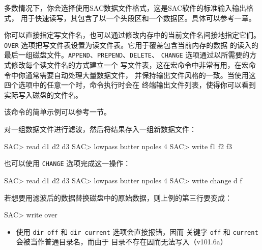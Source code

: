 多数情况下，你会选择使用SAC数据文件格式，这是SAC软件的标准输入输出格式，
用于快速读写，其包含了以一个头段区和一个数据区。具体可以参考一章。

你可以直接指定写文件名，也可以通过修改内存中的当前文件名间接地指定它们。
\texttt{OVER} 选项把写文件表设置为读文件表。它用于覆盖包含当前内存的数据
的读入的最后一组磁盘文件。\texttt{APPEND}、\texttt{PREPEND}、\texttt{DELETE}、
\texttt{CHANGE} 选项通过以所需要的方式修改每个读文件名的方式建立一个
写文件表，这在宏命令中非常有用，在宏命令中你通常需要自动处理大量数据文件，
并保持输出文件风格的一致。当使用这四个选项中的任意一个时，命令执行时会在
终端输出文件列表，使得你可以看到实际写入磁盘的文件名。

该命令的简单示例可以参考一节。

对一组数据文件进行滤波，然后将结果存入一组新数据文件：
\begin{SACCode}
SAC> read d1 d2 d3
SAC> lowpass butter npoles 4
SAC> write f1 f2 f3
\end{SACCode}

也可以使用 \texttt{CHANGE} 选项完成这一操作：
\begin{SACCode}
SAC> read d1 d2 d3
SAC> lowpass butter npoles 4
SAC> write change d f
\end{SACCode}

若想要用滤波后的数据替换磁盘中的原始数据，则上例的第三行要变成：
\begin{SACCode}
SAC> write over
\end{SACCode}

\begin{itemize}
\item 使用 \texttt{dir off} 和 \texttt{dir current} 选项会直接报错，因而
    关键字 \texttt{off} 和 \texttt{current} 会被当作普通目录名，而由于
    目录不存在因而无法写入（v101.6a）
\end{itemize}
